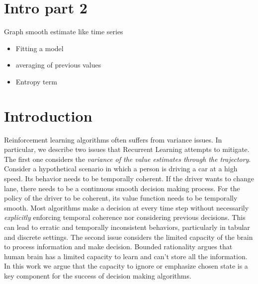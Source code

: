 \section{Intro part 2}
Graph smooth estimate like time series
\begin{itemize}
    \item Fitting a model
    \item averaging of previous values
    \item Entropy term 
\end{itemize}


\section{Introduction}

Reinforcement learning algorithms often suffers from variance issues. In particular, we describe two issues that Recurrent Learning attempts to mitigate. The first one considers the \emph{variance of the value estimates through the trajectory}. Consider a hypothetical scenario in which a person is driving a car at a high speed. Its behavior needs to be temporally coherent. If the driver wants to change lane, there needs to be a continuous smooth decision making process. For the policy of the driver to be coherent, its value function needs to be temporally smooth. Most algorithms make a decision at every time step without necessarily \emph{explicitly} enforcing temporal coherence nor considering previous decisions. This can lead to erratic and temporally inconsistent behaviors, particularly in tabular and discrete settings. The second issue considers the limited capacity of the brain to process information and make decision. Bounded rationality argues that human brain has a limited capacity to learn and can't store all the information. In this work we argue that the capacity to ignore or emphasize chosen state is a key component for the success of decision making algorithms.  